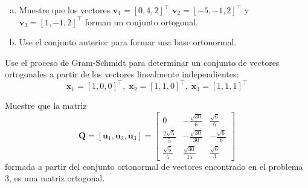 \documentclass[11pt]{article}
\begin{document}
\begin{question} %
    \begin{enumerate}[a)]
        \item Muestre que los vectores $\bm{v}_1 = [0, 4, 2]^{\intercal}$ $\bm{v}_2 = [-5, -1, 2]^{\intercal}$ y $\bm{v}_3 = [1, -1, 2]^{\intercal}$ forman un conjunto ortogonal.
        \item Use el conjunto anterior para formar una base ortonormal.
    \end{enumerate}
\end{question}


\begin{question} %
Use el proceso de Gram-Schmidt para determinar un conjunto de vectores ortogonales a partir de los vectores linealmente independientes:
\[ \bm{x}_1 = [1, 0, 0]^{\intercal}, \; \bm{x}_2 = [1, 1, 0]^{\intercal}, \; \bm{x}_3 = [1, 1, 1]^{\intercal} \]
\end{question}

\begin{question} %
Muestre que la matriz
\[ \bm{Q} = [\bm{u}_1, \bm{u}_2, \bm{u}_3] = 
    \begin{bmatrix} 0 & -\frac{\sqrt{30}}{6} & \frac{\sqrt{6}}{6} \\[0.3em]
        \frac{2 \sqrt{5}}{5} & -\frac{\sqrt{30}}{30} & -\frac{\sqrt{6}}{6} \\[0.3em]
    \frac{\sqrt{5}}{5} & \frac{\sqrt{30}}{15} & \frac{\sqrt{6}}{3} \end{bmatrix} \]
    formada a partir del conjunto ortonormal de vectores encontrado en el problema 3, es una matriz ortogonal.
\end{question}
\end{document}
